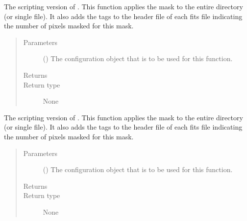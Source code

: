 \documentclass[letterpaper,10pt,english]{sphinxmanual}
\begin{document}

\begin{fulllineitems}
\label{\detokenize{docstrings/ifa_smeargle.masking.scripting:ifa_smeargle.masking.scripting.script_mask_rectangle}}
The scripting version of . This function
applies the mask to the entire directory (or single file). It
also adds the tags to the header file of each fits file
indicating the number of pixels masked for this mask.
\begin{quote}\begin{description}
\item[{Parameters}] \leavevmode
{} () \textendash{} The configuration object that is to be used for this
function.

\item[{Returns}] \leavevmode


\item[{Return type}] \leavevmode
None

\end{description}\end{quote}

\end{fulllineitems}


\begin{fulllineitems}
\label{\detokenize{docstrings/ifa_smeargle.masking.scripting:ifa_smeargle.masking.scripting.script_mask_rows}}
The scripting version of . This function
applies the mask to the entire directory (or single file). It
also adds the tags to the header file of each fits file
indicating the number of pixels masked for this mask.
\begin{quote}\begin{description}
\item[{Parameters}] \leavevmode
{} () \textendash{} The configuration object that is to be used for this
function.

\item[{Returns}] \leavevmode


\item[{Return type}] \leavevmode
None

\end{description}\end{quote}

\end{fulllineitems}
\end{document}
